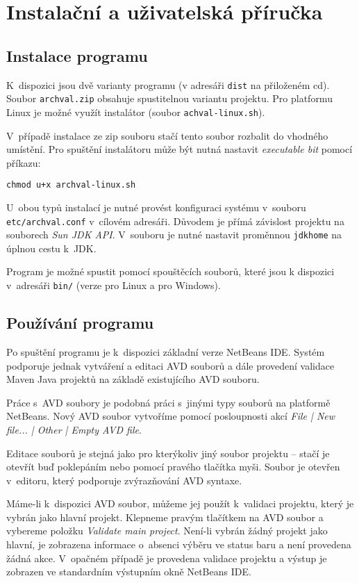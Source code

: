\chapter{Instalační a uživatelská příručka}

\section{Instalace programu}

K~dispozici jsou dvě varianty programu (v adresáři \verb+dist+ na přiloženém cd). Soubor \verb+archval.zip+ obsahuje spustitelnou variantu projektu. Pro platformu Linux je možné využít instalátor (soubor \verb+achval-linux.sh+).

V~případě instalace ze zip souboru stačí tento soubor rozbalit do vhodného umístění. Pro spuštění instalátoru může být nutná nastavit \emph{executable bit} pomocí příkazu:

\begin{verbatim}
chmod u+x archval-linux.sh
\end{verbatim}

U~obou typů instalací je nutné provést konfiguraci systému v~souboru \verb+etc/archval.conf+ v~cílovém adresáři. Důvodem je přímá závislost projektu na souborech \emph{Sun JDK API}. V~souboru je nutné nastavit proměnnou \verb+jdkhome+ na úplnou cestu k~JDK.

Program je možné spustit pomocí spouštěcích souborů, které jsou k dispozici v~adresáři \verb+bin/+ (verze pro Linux a pro Windows).

\section{Používání programu}
Po spuštění programu je k~dispozici základní verze NetBeans IDE. Systém podporuje jednak vytváření a editaci AVD souborů a dále provedení validace Maven Java projektů na základě existujícího AVD souboru.

Práce s~AVD soubory je podobná práci s~jinými typy souborů na platformě NetBeans. Nový AVD soubor vytvoříme pomocí posloupnosti akcí \emph{File | New file... | Other | Empty AVD file}.

Editace souborů je stejná jako pro kterýkoliv jiný soubor projektu -- stačí je otevřít buď poklepáním nebo pomocí pravého tlačítka myši. Soubor je otevřen v~editoru, který podporuje zvýrazňování AVD syntaxe.

Máme-li k~dispozici AVD soubor, můžeme jej použít k~validaci projektu, který je vybrán jako hlavní projekt. Klepneme pravým tlačítkem na AVD soubor a vybereme položku \emph{Validate main project}. Není-li vybrán žádný projekt jako hlavní, je zobrazena informace o~absenci výběru ve status baru a není provedena žádná akce. V~opačném případě je provedena validace projektu a výstup je zobrazen ve standardním výstupním okně NetBeans IDE.

